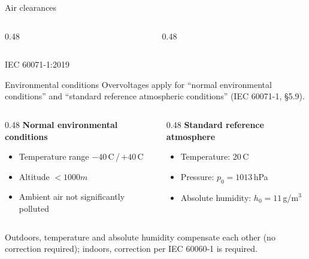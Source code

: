 \begin{frame}{Air clearances}
  \begin{columns}[c,onlytextwidth]
    \begin{column}{0.48\textwidth}
      \centering
    \end{column}
    \begin{column}{0.48\textwidth}
      \centering
    \end{column}
  \end{columns}
  \vspace{0.3em}
  \centering
  {\color{atGray}\footnotesize IEC 60071-1:2019}
\end{frame}

\begin{frame}{Environmental conditions}
  Overvoltages apply for ``normal environmental conditions'' and ``standard reference atmospheric conditions'' (IEC 60071-1, §5.9).
  \vspace{1em}
  \begin{columns}[T,onlytextwidth]
    \begin{column}{0.48\textwidth}
      \textbf{Normal environmental conditions}
      \begin{itemize}
        \setlength{\itemsep}{0.3em}
        \item Temperature range $-40$\,\textdegree C\,/\,$+40$\,\textdegree C
        \item Altitude $<1000m$
        \item Ambient air not significantly polluted
      \end{itemize}
    \end{column}
    \begin{column}{0.48\textwidth}
      \textbf{Standard reference atmosphere}
      \begin{itemize}
        \setlength{\itemsep}{0.3em}
        \item Temperature: 20\,\textdegree C
        \item Pressure: $p_0 = 1013$\,hPa
        \item Absolute humidity: $h_0 = 11$\,g/m$^3$
      \end{itemize}
    \end{column}
  \end{columns}
  \vspace{1em}
  Outdoors, temperature and absolute humidity compensate each other (no correction required); indoors, correction per IEC 60060-1 is required.
\end{frame}

